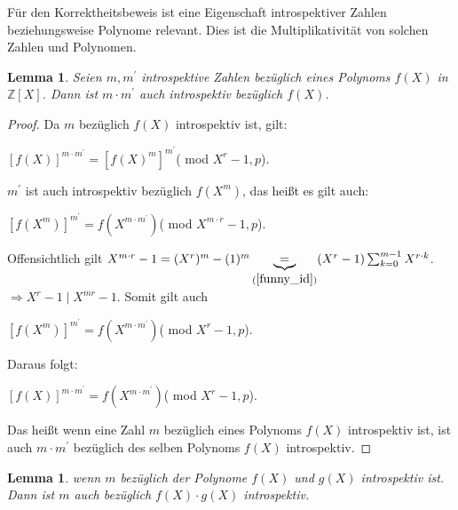 \documentclass[12pt,oneside]{article}
\newtheorem{lemma}[theorem]{Lemma}
\theoremstyle{remark}
\theoremstyle{definition}
\begin{document}
Für den Korrektheitsbeweis ist eine Eigenschaft introspektiver Zahlen beziehungsweise Polynome relevant. Dies ist die Multiplikativität von solchen Zahlen und Polynomen.\newline\newline

\begin{lemma}\label{intros_num}
Seien $m,m^{'}$ introspektive Zahlen bezüglich eines Polynoms $f(X)$ in $\mathbb{Z}[X]$. Dann ist $m \cdot m^{'}$ auch introspektiv bezüglich $f(X)$.
\end{lemma}

\begin{proof}
Da $m$ bezüglich $f(X)$ introspektiv ist, gilt:\newline\newline
\centerline{$[f(X)]^{m \cdot m^{'}} = [f(X)^{m}]^{m^{'}}$( mod $X^r - 1, p$).}\newline\newline
$m^{'}$ ist auch introspektiv bezüglich $f(X^{m})$, das heißt es gilt auch:\newline\newline
\centerline{$[f(X^m)]^{m^{'}} = f(X^{m \cdot m^{'}})$( mod $X^{m\cdot r} - 1, p$).}\newline\newline

Offensichtlich gilt $X^{m \cdot r } - 1 = (X^{r})^{m} - (1)^m \underbrace{=}_{(\ref{funny_id})} (X^{r} - 1) \sum_{k = 0}^{m-1} X^{r \cdot k}$.\newline\newline$\Rightarrow X^{r} - 1\mid X^{mr} - 1$. Somit gilt auch\newline\newline
\centerline{$[f(X^m)]^{m^{'}} = f(X^{m \cdot m^{'}})$( mod $X^{r} - 1,p$).}\newline

Daraus folgt:\newline\newline
\centerline{$[f(X)]^{m \cdot m^{'}} = f(X^{m \cdot m^{'}}) $( mod $X^r - 1, p$).}\newline

Das heißt wenn eine Zahl $m$ bezüglich eines Polynoms $f(X)$ introspektiv ist, ist auch $m \cdot m^{'}$ bezüglich des selben Polynoms $f(X)$ introspektiv. 
\end{proof}

\smallskip

\begin{lemma}
wenn $m$ bezüglich der Polynome $f(X)$ und $g(X)$ introspektiv ist. Dann ist $m$ auch bezüglich $f(X) \cdot g(X)$ introspektiv.  
\end{lemma}
\end{document}
